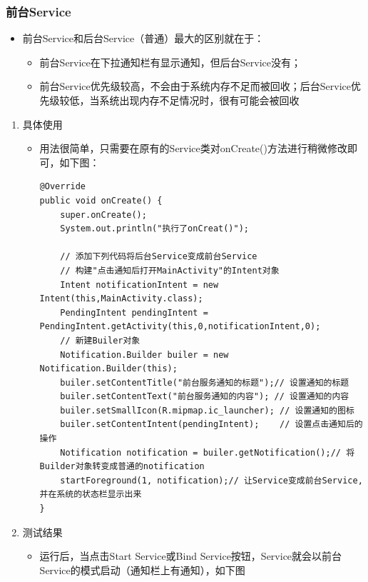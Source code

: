 \documentclass[9pt, b5paper]{article}
\begin{document}
\subsubsection{前台Service}
\label{sec-3-4-3}
\begin{itemize}
\item 前台Service和后台Service（普通）最大的区别就在于：
\begin{itemize}
\item 前台Service在下拉通知栏有显示通知，但后台Service没有；
\item 前台Service优先级较高，不会由于系统内存不足而被回收；后台Service优先级较低，当系统出现内存不足情况时，很有可能会被回收
\end{itemize}
\end{itemize}
\begin{enumerate}
\item 具体使用
\label{sec-3-4-3-1}
\begin{itemize}
\item 用法很简单，只需要在原有的Service类对onCreate()方法进行稍微修改即可，如下图：
\begin{verbatim}
@Override
public void onCreate() {
    super.onCreate();
    System.out.println("执行了onCreat()");

    // 添加下列代码将后台Service变成前台Service
    // 构建"点击通知后打开MainActivity"的Intent对象
    Intent notificationIntent = new Intent(this,MainActivity.class);
    PendingIntent pendingIntent = PendingIntent.getActivity(this,0,notificationIntent,0);
    // 新建Builer对象
    Notification.Builder builer = new Notification.Builder(this);
    builer.setContentTitle("前台服务通知的标题");// 设置通知的标题
    builer.setContentText("前台服务通知的内容"); // 设置通知的内容
    builer.setSmallIcon(R.mipmap.ic_launcher); // 设置通知的图标
    builer.setContentIntent(pendingIntent);    // 设置点击通知后的操作
    Notification notification = builer.getNotification();// 将Builder对象转变成普通的notification
    startForeground(1, notification);// 让Service变成前台Service,并在系统的状态栏显示出来
}
\end{verbatim}
\end{itemize}
\item 测试结果
\label{sec-3-4-3-2}
\begin{itemize}
\item 运行后，当点击Start Service或Bind Service按钮，Service就会以前台Service的模式启动（通知栏上有通知），如下图


\end{itemize}
\end{enumerate}
\end{document}
